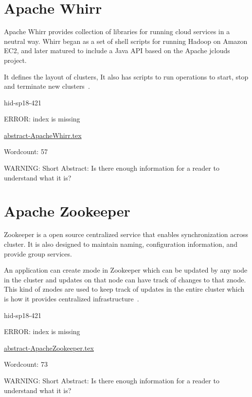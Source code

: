 \section{Apache Whirr}

Apache Whirr provides collection of libraries for running cloud
services in a neutral way. Whirr began as a set of shell scripts for
running Hadoop on Amazon EC2, and later matured to include a Java API
based on the Apache jclouds project.

It defines the layout of clusters, It also has scripts to run
operations to start, stop and terminate new
clusters~\cite{hid-sp18-421-whirrCloud}.



\begin{IU}

hid-sp18-421

ERROR: index is missing

\href{https://github.com/cloudmesh-community/hid-sp18-421/blob/master//technology/abstract-ApacheWhirr.tex}{abstract-ApacheWhirr.tex}

 

Wordcount: 57

WARNING: Short Abstract: Is there enough information for a reader to understand what it is?

\end{IU}

\section{Apache Zookeeper}

Zookeeper is a open source centralized service that enables synchronization
across cluster. It is also designed to maintain naming, configuration
information, and provide  group services.

An application can create znode in Zookeeper which can be updated by any node in
the cluster and updates on that node can have track of changes to that znode.
This kind of znodes are used to keep track of updates in the entire cluster
which is how it provides centralized 
infrastructure~\cite{hid-sp18-421-zookeeper}.




\begin{IU}

hid-sp18-421

ERROR: index is missing

\href{https://github.com/cloudmesh-community/hid-sp18-421/blob/master//technology/abstract-ApacheZookeeper.tex}{abstract-ApacheZookeeper.tex}

 

Wordcount: 73

WARNING: Short Abstract: Is there enough information for a reader to understand what it is?

\end{IU}

